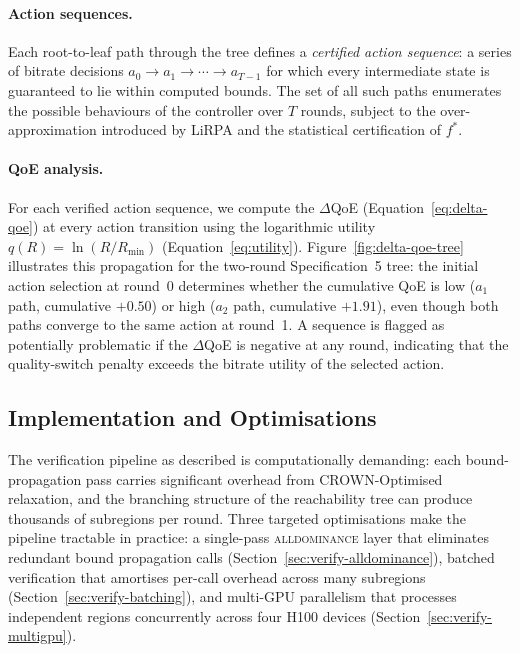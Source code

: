 \documentclass[thesis]{uofithesis} %
\begin{document}
    \paragraph{Action sequences.}
    Each root-to-leaf path through the tree defines a \emph{certified
    action sequence}: a series of bitrate decisions
    $a_0 \to a_1 \to \cdots \to a_{T-1}$ for which every intermediate
    state is guaranteed to lie within computed bounds.  The set of all such
    paths enumerates the possible behaviours of the controller over $T$
    rounds, subject to the over-approximation introduced by LiRPA and the
    statistical certification of $f^{\ast}$.

    \paragraph{QoE analysis.}
    For each verified action sequence, we compute the $\Delta$QoE
    (Equation~\ref{eq:delta-qoe}) at every action transition using the
    logarithmic utility $q(R) = \ln(R/R_{\min})$
    (Equation~\eqref{eq:utility}).
    Figure~\ref{fig:delta-qoe-tree} illustrates this
    propagation for the two-round Specification~5 tree: the initial
    action selection at round~0 determines whether the cumulative QoE
    is low ($a_1$ path, cumulative $+0.50$) or high ($a_2$ path,
    cumulative $+1.91$), even though both paths converge to the same
    action at round~1.
    A sequence is flagged as potentially problematic if the $\Delta$QoE
    is negative at any round, indicating that the quality-switch
    penalty exceeds the bitrate utility of the selected action.


    \subsection{Implementation and Optimisations}
    \label{sec:verify-impl}

    The verification pipeline as described is computationally demanding:
    each bound-propagation pass carries significant overhead from
    CROWN-Optimised relaxation, and the branching structure of the
    reachability tree can produce thousands of subregions per round.  Three
    targeted optimisations make the pipeline tractable in practice:
    a single-pass \textsc{alldominance} layer that eliminates redundant bound
    propagation calls (Section~\ref{sec:verify-alldominance}), batched
    verification that amortises per-call overhead across many subregions
    (Section~\ref{sec:verify-batching}), and multi-GPU parallelism that
    processes independent regions concurrently across four H100 devices
    (Section~\ref{sec:verify-multigpu}).
\end{document}
